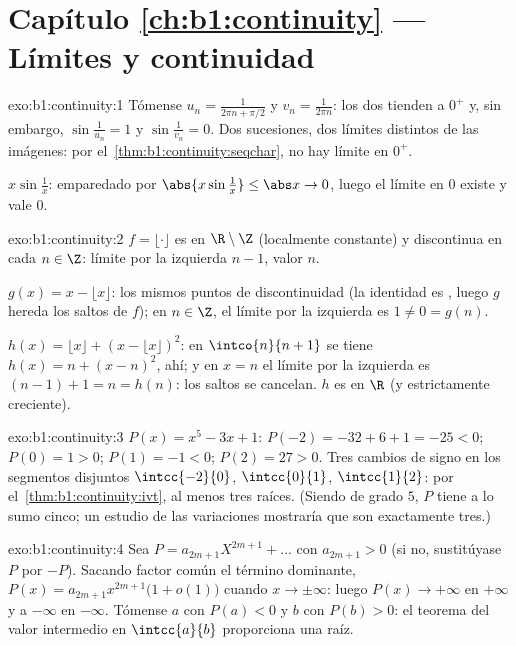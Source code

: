 \section*{Capítulo \ref{ch:b1:continuity} --- Límites y continuidad}

\begin{solution}{exo:b1:continuity:1}
Tómense $u_n = \frac{1}{2\pi n + \pi/2}$ y $v_n = \frac{1}{2\pi n}$:
los dos tienden a $0^+$ y, sin embargo, $\sin\frac{1}{u_n} = 1$ y
$\sin\frac{1}{v_n} = 0$. Dos sucesiones, dos límites distintos de las
imágenes: por el~\cref{thm:b1:continuity:seqchar}, no hay límite en
$0^+$.

$x \sin\frac1x$: emparedado por $\abs{x\sin\frac1x} \leq \abs x \to 0$,
luego el límite en $0$ existe y vale $0$.
\end{solution}

\begin{solution}{exo:b1:continuity:2}
$f = \lfloor\cdot\rfloor$ es  en $\R \setminus \Z$ (localmente
constante) y discontinua en cada $n \in \Z$: límite por la izquierda
$n - 1$, valor $n$.

$g(x) = x - \lfloor x\rfloor$: los mismos puntos de discontinuidad (la
identidad es , luego $g$ hereda los saltos de $f$); en
$n \in \Z$, el límite por la izquierda es $1 \neq 0 = g(n)$.

$h(x) = \lfloor x\rfloor + (x - \lfloor x\rfloor)^2$: en
$\intco{n}{n + 1}$ se tiene $h(x) = n + (x - n)^2$,  ahí; y en
$x = n$ el límite por la izquierda es $(n-1) + 1 = n = h(n)$: los
saltos se cancelan. $h$ es  en $\R$ (y estrictamente creciente).
\end{solution}

\begin{solution}{exo:b1:continuity:3}
$P(x) = x^5 - 3x + 1$: $P(-2) = -32 + 6 + 1 = -25 < 0$; $P(0) = 1 > 0$;
$P(1) = -1 < 0$; $P(2) = 27 > 0$. Tres cambios de signo en los
segmentos disjuntos $\intcc{-2}{0}$, $\intcc{0}{1}$, $\intcc{1}{2}$:
por el~\cref{thm:b1:continuity:ivt}, al menos tres raíces. (Siendo de
grado $5$, $P$ tiene a lo sumo cinco; un estudio de las variaciones
mostraría que son exactamente tres.)
\end{solution}

\begin{solution}{exo:b1:continuity:4}
Sea $P = a_{2m+1}X^{2m+1} + \dots$ con $a_{2m+1} > 0$ (si no,
sustitúyase $P$ por $-P$). Sacando factor común el término dominante,
$P(x) = a_{2m+1} x^{2m+1}\bigl(1 + o(1)\bigr)$ cuando
$x \to \pm\infty$: luego $P(x) \to +\infty$ en $+\infty$ y a $-\infty$
en $-\infty$. Tómense $a$ con $P(a) < 0$ y $b$ con $P(b) > 0$: el
teorema del valor intermedio en $\intcc{a}{b}$ proporciona una raíz.
\end{solution}

